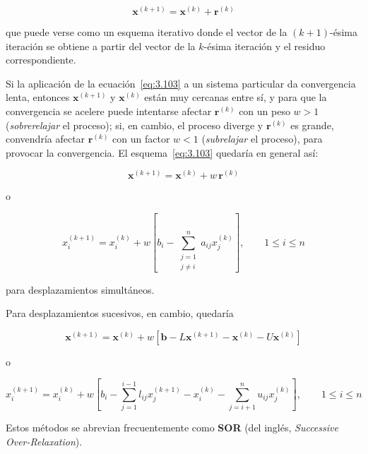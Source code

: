 \documentclass[12pt,letterpaper]{article}
\theoremstyle{definition}
\theoremstyle{plain}
\theoremstyle{remark}
\begin{document}
\begin{equation}
\mathbf{x}^{(k+1)} = \mathbf{x}^{(k)} + \mathbf{r}^{(k)}
\label{eq:3.103}
\tag{23}
\end{equation}

que puede verse como un esquema iterativo donde el vector de la $(k+1)$-ésima iteración se obtiene a partir del vector de la $k$-ésima iteración y el residuo correspondiente.

Si la aplicación de la ecuación~\eqref{eq:3.103} a un sistema particular da convergencia lenta, entonces $\mathbf{x}^{(k+1)}$ y $\mathbf{x}^{(k)}$ están muy cercanas entre sí, y para que la convergencia se acelere puede intentarse afectar $\mathbf{r}^{(k)}$ con un peso $w > 1$ (\textit{sobrerelajar} el proceso); si, en cambio, el proceso diverge y $\mathbf{r}^{(k)}$ es grande, convendría afectar $\mathbf{r}^{(k)}$ con un factor $w < 1$ (\textit{subrelajar} el proceso), para provocar la convergencia. El esquema~\eqref{eq:3.103} quedaría en general así:

\begin{equation}
\mathbf{x}^{(k+1)} = \mathbf{x}^{(k)} + w\, \mathbf{r}^{(k)}
\label{eq:3.104}
\tag{24}
\end{equation}

o

\begin{equation}
x_i^{(k+1)} = x_i^{(k)} + w \left[b_i - \sum_{\substack{j=1 \\ j \ne i}}^n a_{ij} x_j^{(k)}\right], \qquad 1 \le i \le n
\label{eq:3.105}
\tag{25}
\end{equation}

para desplazamientos simultáneos.

Para desplazamientos sucesivos, en cambio, quedaría

\begin{equation}
\mathbf{x}^{(k+1)} = \mathbf{x}^{(k)} + w \left[\mathbf{b} - L \mathbf{x}^{(k+1)} - \mathbf{x}^{(k)} - U \mathbf{x}^{(k)} \right]
\label{eq:3.106}
\tag{26}
\end{equation}

o

\begin{equation}
x_i^{(k+1)} = x_i^{(k)} + w \left[b_i - \sum_{j=1}^{i-1} l_{ij} x_j^{(k+1)} - x_i^{(k)} - \sum_{j=i+1}^n u_{ij} x_j^{(k)} \right], \qquad 1 \le i \le n
\label{eq:3.107}
\tag{27}
\end{equation}

Estos métodos se abrevian frecuentemente como \textbf{SOR} (del inglés, \textit{Successive Over-Relaxation}).
\end{document}
